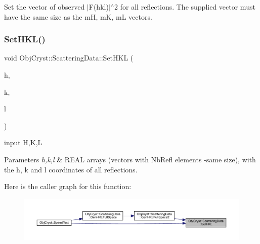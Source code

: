 Set the vector of observed $\vert$F(hkl)$\vert$$^\wedge$2 for all reflections. The supplied vector must have the same size as the mH, mK, mL vectors. \mbox{\label{class_obj_cryst_1_1_scattering_data_a0520a10b24b0e4f05ba5cee4f3e29c92}} 
\subsubsection{\texorpdfstring{SetHKL()}{SetHKL()}}
{\footnotesize\ttfamily void Obj\+Cryst\+::\+Scattering\+Data\+::\+Set\+H\+KL (\begin{DoxyParamCaption}\item[{const Cryst\+Vector\+\_\+\+R\+E\+AL \&}]{h,  }\item[{const Cryst\+Vector\+\_\+\+R\+E\+AL \&}]{k,  }\item[{const Cryst\+Vector\+\_\+\+R\+E\+AL \&}]{l }\end{DoxyParamCaption})\hspace{0.3cm}{\ttfamily [virtual]}}



input H,K,L 


\begin{DoxyParams}{Parameters}
{\em h,k,l} & R\+E\+AL arrays (vectors with Nb\+Refl elements -\/same size), with the h, k and l coordinates of all reflections. \\
\hline
\end{DoxyParams}
Here is the caller graph for this function\+:
\nopagebreak
\begin{figure}[H]
\begin{center}
\leavevmode
\includegraphics[width=350pt]{class_obj_cryst_1_1_scattering_data_a0520a10b24b0e4f05ba5cee4f3e29c92_icgraph}
\end{center}
\end{figure}
\mbox{\label{class_obj_cryst_1_1_scattering_data_ae126b860d309daa78e975b8b6d8a3ec0}} 
